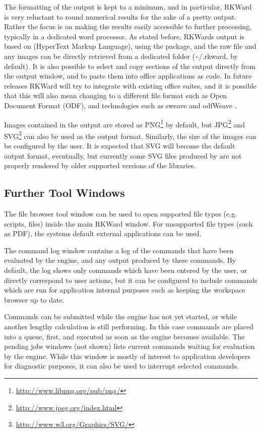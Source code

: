 The formatting of the output is kept to a minimum, and in particular,
RKWard is very reluctant to round numerical results for the sake of a
pretty output. Rather the focus is on making the results easily
accessible to further processing, typically in a dedicated word
processor. As stated before, RKWards output is based on
 (HyperText Markup Language), using the
 package, and the raw
 file and any images can be directly
retrieved from a dedicated folder
(\~{}/.rkward, by default). It is also
possible to select and copy sections of the output directly from the
output window, and to paste them into office applications as
 code. In future releases RKWard will
try to integrate with existing office suites, and it is possible that
this will also mean changing to a different file format such as Open
Document Format (ODF), and technologies such as sweave and odfWeave
\citep{Leisch2002, Kuhn2006}.

Images contained in the output are stored as
PNG\footnote{\url{http://www.libpng.org/pub/png/}} by
default, but
JPG\footnote{\url{http://www.jpeg.org/index.html}} and
SVG\footnote{\url{http://www.w3.org/Graphics/SVG/}}
can also be used as the output format. Similarly, the size of the
images can be configured by the user. It is expected that SVG will
become the default output format, eventually, but currently some SVG
files produced by  are not properly
rendered by older supported versions of the
 libraries.


\subsection{Further Tool Windows}
\label{sec:further_tool_windows}

The file browser tool window can be
used to open supported file types (e.g. 
scripts,  files) inside the main RKWard
window. For unsupported file types (such as PDF), the
systems default external applications can be used.

The command log window contains a log of the commands that have been
evaluated by the  engine, and any output
produced by these commands. By default, the log shows only commands
which have been entered by the user, or directly correspond to user
actions, but it can be configured to include commands which are run for
application internal purposes such as keeping the workspace browser up
to date.

Commands can be submitted while the  engine
has not yet started, or while another lengthy calculation is still
performing. In this case commands are placed into a queue, first, and
executed as soon as the  engine becomes
available. The pending jobs windows (not
shown) lists current  commands waiting for
evaluation by the  engine. While this
window is mostly of interest to application developers for diagnostic
purposes, it can also be used to interrupt selected commands.

